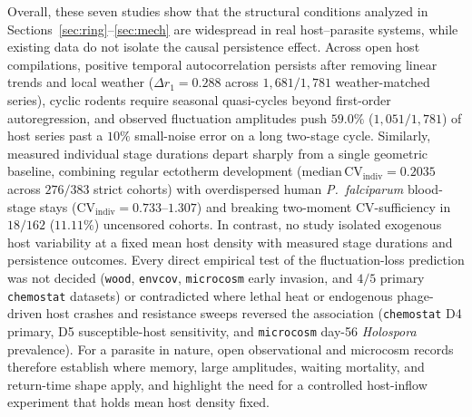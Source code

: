 Overall, these seven studies show that the structural conditions analyzed in Sections~\ref{sec:ring}--\ref{sec:mech} are widespread in real host--parasite systems, while existing data do not isolate the causal persistence effect. Across open host compilations, positive temporal autocorrelation persists after removing linear trends and local weather ($\Delta r_1 = 0.288$ across $1{,}681/1{,}781$ weather-matched series), cyclic rodents require seasonal quasi-cycles beyond first-order autoregression, and observed fluctuation amplitudes push $59.0\%$ ($1{,}051/1{,}781$) of host series past a $10\%$ small-noise error on a long two-stage cycle. Similarly, measured individual stage durations depart sharply from a single geometric baseline, combining regular ectotherm development ($\text{median}\,\mathrm{CV}_{\mathrm{indiv}} = 0.2035$ across $276/383$ strict cohorts) with overdispersed human \textit{P.~falciparum} blood-stage stays ($\mathrm{CV}_{\mathrm{indiv}} = 0.733$--$1.307$) and breaking two-moment CV-sufficiency in $18/162$ ($11.11\%$) uncensored cohorts. In contrast, no study isolated exogenous host variability at a fixed mean host density with measured stage durations and persistence outcomes. Every direct empirical test of the fluctuation-loss prediction was not decided (\texttt{wood}, \texttt{envcov}, \texttt{microcosm} early invasion, and $4/5$ primary \texttt{chemostat} datasets) or contradicted where lethal heat or endogenous phage-driven host crashes and resistance sweeps reversed the association (\texttt{chemostat} D4 primary, D5 susceptible-host sensitivity, and \texttt{microcosm} day-56 \textit{Holospora} prevalence). For a parasite in nature, open observational and microcosm records therefore establish where memory, large amplitudes, waiting mortality, and return-time shape apply, and highlight the need for a controlled host-inflow experiment that holds mean host density fixed.

